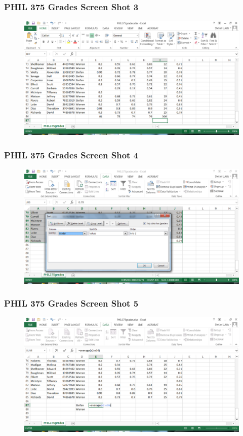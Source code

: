 \documentclass[xcolor=dvipsnames]{beamer}
\begin{document}
\begin{frame}
  \frametitle{PHIL 375 Grades Screen Shot 3}
  \begin{figure}[h]
    \includegraphics[scale=.42]{./e03.PNG}
  \end{figure}
\end{frame}

\begin{frame}
  \frametitle{PHIL 375 Grades Screen Shot 4}
  \begin{figure}[h]
    \includegraphics[scale=.42]{./e04.PNG}
  \end{figure}
\end{frame}

\begin{frame}
  \frametitle{PHIL 375 Grades Screen Shot 5}
  \begin{figure}[h]
    \includegraphics[scale=.42]{./e05.PNG}
  \end{figure}
\end{frame}
\end{document}
